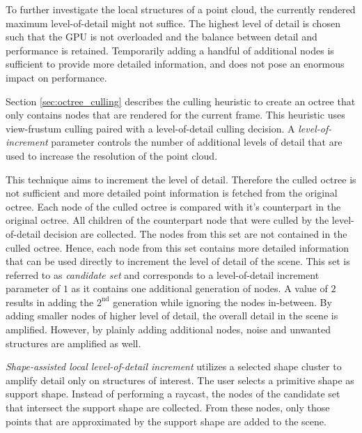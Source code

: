 To further investigate the local structures of a point cloud, the currently rendered maximum level-of-detail might not suffice. The highest level of detail is chosen such that the GPU is not overloaded and the balance between detail and performance is retained. Temporarily adding a handful of additional nodes is sufficient to provide more detailed information, and does not pose an enormous impact on performance. 
    
\par

Section \ref{sec:octree_culling} describes the culling heuristic to create an octree that only contains nodes that are rendered for the current frame. This heuristic uses view-frustum culling paired with a level-of-detail culling decision. A \textit{level-of-increment} parameter controls the number of additional levels of detail that are used to increase the resolution of the point cloud. 

\par

This technique aims to increment the level of detail. Therefore the culled octree is not sufficient and more detailed point information is fetched from the original octree. Each node of the culled octree is compared with it's counterpart in the original octree. All children of the counterpart node that were culled by the level-of-detail decision are collected. The nodes from this set are not contained in the culled octree. Hence, each node from this set contains more detailed information that can be used directly to increment the level of detail of the scene. This set is referred to as \textit{candidate set} and corresponds to a level-of-detail increment parameter of $1$ as it contains one additional generation of nodes. A value of $2$ results in adding the $2^{\text{nd}}$ generation while ignoring the nodes in-between. By adding smaller nodes of higher level of detail, the overall detail in the scene is amplified. However, by plainly adding additional nodes, noise and unwanted structures are amplified as well. 

\par
    
\textit{Shape-assisted local level-of-detail increment} utilizes a selected shape cluster to amplify detail only on structures of interest. The user selects a primitive shape as support shape. Instead of performing a raycast, the nodes of the candidate set that intersect the support shape are collected. From these nodes, only those points that are approximated by the support shape are added to the scene. 
    
